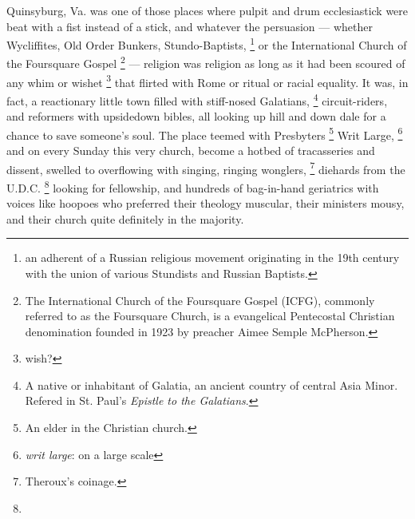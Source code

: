   Quinsyburg, Va. was one of those places where pulpit 
and drum ecclesiastick were beat with a fist instead of a stick, and whatever 
the persuasion --- whether Wycliffites, Old Order Bunkers, Stundo-Baptists, 
\footnote{an adherent of a Russian religious movement originating in the 19th
  century with the union of various Stundists and Russian Baptists.}
or the International Church of the Foursquare Gospel 
\footnote{The International Church of the Foursquare Gospel (ICFG), commonly
  referred to as the Foursquare Church, is a evangelical Pentecostal Christian
  denomination founded in 1923 by preacher Aimee Semple McPherson.}
--- religion was religion as long as it had been scoured 
of any whim 
or wishet 
\footnote{ \textdbend wish?}
that flirted with Rome or ritual or racial equality. It was,
in fact, a reactionary little town filled with stiff-nosed Galatians,
\footnote{ A native or inhabitant of Galatia, an ancient country of central Asia
  Minor. Refered in St. Paul's \textit{Epistle to the Galatians}. }
circuit-riders, and reformers with upsidedown bibles, all looking up hill and
down dale 
for a chance to save someone's soul. The place teemed 
with Presbyters 
\footnote{An elder in the Christian church.}
Writ Large, 
\footnote{\textit{writ large}: on a large scale}
and on every Sunday this very church, become a hotbed of tracasseries 
and dissent, swelled to overflowing with singing, ringing wonglers,
\footnote{\textdbend Theroux's coinage. }
diehards from the U.D.C. 
\footnote{ \textdbend}
looking for fellowship, and hundreds of bag-in-hand geriatrics 
with voices like hoopoes 
who preferred their theology muscular, their ministers mousy, 
and their church quite definitely in the majority.

